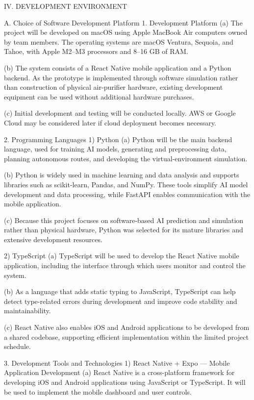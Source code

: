IV.	DEVELOPMENT ENVIRONMENT

A.	 Choice of Software Development Platform
1. Development Platform
(a) The project will be developed on macOS using Apple MacBook Air computers owned by team members. The operating systems are macOS Ventura, Sequoia, and Tahoe, with Apple M2–M3 processors and 8–16 GB of RAM.

(b) The system consists of a React Native mobile application and a Python backend. As the prototype is implemented through software simulation rather than construction of physical air-purifier hardware, existing development equipment can be used without additional hardware purchases.

(c) Initial development and testing will be conducted locally. AWS or Google Cloud may be considered later if cloud deployment becomes necessary.

2. Programming Languages
1) Python
(a) Python will be the main backend language, used for training AI models, generating and preprocessing data, planning autonomous routes, and developing the virtual-environment simulation.

(b) Python is widely used in machine learning and data analysis and supports libraries such as scikit-learn, Pandas, and NumPy. These tools simplify AI model development and data processing, while FastAPI enables communication with the mobile application.

(c) Because this project focuses on software-based AI prediction and simulation rather than physical hardware, Python was selected for its mature libraries and extensive development resources.

2) TypeScript
(a) TypeScript will be used to develop the React Native mobile application, including the interface through which users monitor and control the system.

(b) As a language that adds static typing to JavaScript, TypeScript can help detect type-related errors during development and improve code stability and maintainability.

(c) React Native also enables iOS and Android applications to be developed from a shared codebase, supporting efficient implementation within the limited project schedule.

3. Development Tools and Technologies
1) React Native + Expo — Mobile Application Development
(a) React Native is a cross-platform framework for developing iOS and Android applications using JavaScript or TypeScript. It will be used to implement the mobile dashboard and user controls.

